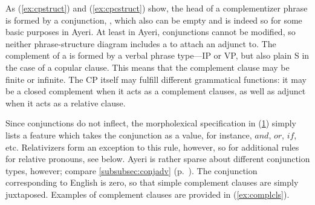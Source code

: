 \begin{figure}[h]
\begin{morphlex}
\ex\label{ex:cmorphlex}%
\xe
\end{morphlex}
\end{figure}

As (\ref{ex:cpstruct}) and (\ref{ex:cpcstruct}) show, the head of a
complementizer phrase is formed by a conjunction, , which also can be
empty and is indeed so for some basic purposes in Ayeri. At least in Ayeri,
conjunctions cannot be modified, so neither phrase-structure diagram includes a
 to attach an adjunct to. The complement of a  is formed by a
verbal phrase type---IP or VP, but also plain S in the case of a copular clause.
This means that the complement clause may be finite or infinite. The CP itself
may fulfill different grammatical functions: it may be a closed complement when
it acts as a complement clauses, as well as adjunct when it acts as a relative
clause.

Since conjunctions do not inflect, the morpholexical specification in
(\ref{ex:cmorphlex}) simply lists a \Conj{} feature which takes the conjunction
as a value, for instance, $and$, $or$, $if$, etc. Relativizers form an
exception to this rule, however, so for additional rules for relative pronouns,
see below. Ayeri is rather sparse about different conjunction types, however;
compare \autoref{subsubsec:conjadv} (p.~\pageref{subsubsec:conjadv}). The
conjunction corresponding to English  is zero, so that simple
complement clauses are simply juxtaposed. Examples of complement clauses are
provided in (\ref{ex:complcls}).

